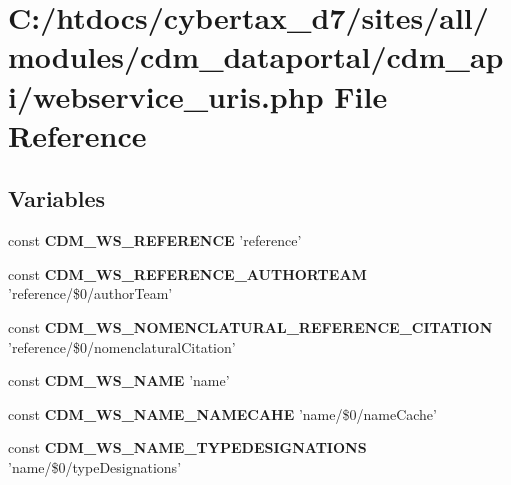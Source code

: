 \hypertarget{webservice__uris_8php}{\section{C\-:/htdocs/cybertax\-\_\-d7/sites/all/modules/cdm\-\_\-dataportal/cdm\-\_\-api/webservice\-\_\-uris.php File Reference}
\label{webservice__uris_8php}
}
\subsection*{Variables}
\begin{DoxyCompactItemize}
\item 
\hypertarget{webservice__uris_8php_a10953a47565616d1808ddfa528a6b1c4}{const {\bfseries C\-D\-M\-\_\-\-W\-S\-\_\-\-R\-E\-F\-E\-R\-E\-N\-C\-E} 'reference'}\label{webservice__uris_8php_a10953a47565616d1808ddfa528a6b1c4}

\item 
\hypertarget{webservice__uris_8php_a4b64940d0d8548aa412ee4bde9c49338}{const {\bfseries C\-D\-M\-\_\-\-W\-S\-\_\-\-R\-E\-F\-E\-R\-E\-N\-C\-E\-\_\-\-A\-U\-T\-H\-O\-R\-T\-E\-A\-M} 'reference/\$0/author\-Team'}\label{webservice__uris_8php_a4b64940d0d8548aa412ee4bde9c49338}

\item 
\hypertarget{webservice__uris_8php_a8e8ab297939b4a56698f07ebfe2edf37}{const {\bfseries C\-D\-M\-\_\-\-W\-S\-\_\-\-N\-O\-M\-E\-N\-C\-L\-A\-T\-U\-R\-A\-L\-\_\-\-R\-E\-F\-E\-R\-E\-N\-C\-E\-\_\-\-C\-I\-T\-A\-T\-I\-O\-N} 'reference/\$0/nomenclatural\-Citation'}\label{webservice__uris_8php_a8e8ab297939b4a56698f07ebfe2edf37}

\item 
\hypertarget{webservice__uris_8php_ac2a9279950dcf16d6aa56a8dfa3372dd}{const {\bfseries C\-D\-M\-\_\-\-W\-S\-\_\-\-N\-A\-M\-E} 'name'}\label{webservice__uris_8php_ac2a9279950dcf16d6aa56a8dfa3372dd}

\item 
\hypertarget{webservice__uris_8php_a83677369cc1a482d8fbad601cd8c85f5}{const {\bfseries C\-D\-M\-\_\-\-W\-S\-\_\-\-N\-A\-M\-E\-\_\-\-N\-A\-M\-E\-C\-A\-H\-E} 'name/\$0/name\-Cache'}\label{webservice__uris_8php_a83677369cc1a482d8fbad601cd8c85f5}

\item 
\hypertarget{webservice__uris_8php_ac564129ad2f145799fa8784dfc683af3}{const {\bfseries C\-D\-M\-\_\-\-W\-S\-\_\-\-N\-A\-M\-E\-\_\-\-T\-Y\-P\-E\-D\-E\-S\-I\-G\-N\-A\-T\-I\-O\-N\-S} 'name/\$0/type\-Designations'}\label{webservice__uris_8php_ac564129ad2f145799fa8784dfc683af3}


\end{DoxyCompactItemize}
